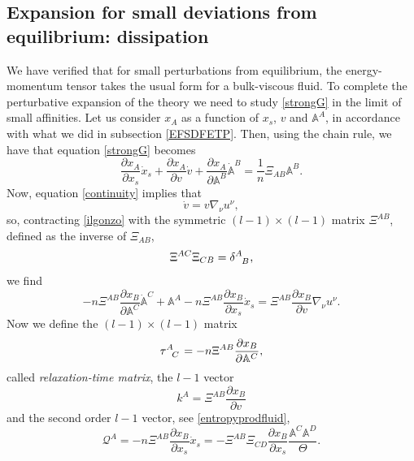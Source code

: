 \documentclass[useAMS,usenatbib,prd,twocolumn,nofootinbib]{revtex4-1}
\begin{document}
\subsection{Expansion for small deviations from equilibrium: dissipation}\label{expBuba!}

We have verified that for small perturbations from equilibrium, the energy-momentum tensor takes the usual form for a bulk-viscous fluid. To complete the perturbative expansion of the theory we need to study \eqref{strongG} in the limit of small affinities. 
Let us consider $x_A$ as a function of $x_s$, $v$ and $\mathbb{A}^A$, in accordance with what we did in subsection \ref{EFSDFETP}. Then, using the chain rule, we have that equation \eqref{strongG} becomes
\begin{equation}\label{ilgonzo}
\dfrac{\partial x_A}{\partial x_s} \dot{x}_s + \dfrac{\partial x_A}{\partial v} \dot{v} +  \dfrac{\partial x_A}{\partial \mathbb{A}^B} \dot{\mathbb{A}}^B = \dfrac{1}{n}  \Xi_{AB} \mathbb{A}^B.
\end{equation}
Now, equation \eqref{continuity} implies that
\begin{equation}
\dot{v} = v \nabla_\nu u^\nu ,
\end{equation}
so, contracting \eqref{ilgonzo} with the symmetric $(l-1)\times(l-1)$ matrix $\Xi^{AB}$, defined as the inverse of $\Xi_{AB}$,
\begin{equation}\label{inversemetric}
 \Xi^{AC} \Xi_{CB} = \delta\indices{^A _B}  ,
\end{equation}
we find
\begin{equation}\label{buzzzzurro}
-n \Xi^{AB} \dfrac{\partial x_B}{\partial \mathbb{A}^C} \dot{\mathbb{A}}^C + \mathbb{A}^A - n \Xi^{AB} \dfrac{\partial x_B}{\partial x_s} \dot{x}_s = \Xi^{AB} \dfrac{\partial x_B}{\partial v} \nabla_\nu u^\nu .
\end{equation}
Now we define the $(l-1)\times (l-1)$ matrix
\begin{equation}\label{TTau}
\tau\indices{^A _C} = -n \Xi^{AB} \dfrac{\partial x_B}{\partial \mathbb{A}^C},
\end{equation}
called \textit{relaxation-time matrix}, the $l-1$ vector
\begin{equation}\label{kappa}
k^A = \Xi^{AB} \dfrac{\partial x_B}{\partial v} 
\end{equation}
and the second order $l-1$ vector, see \eqref{entropyprodfluid},
\begin{equation}
\mathcal{Q}^A = - n \Xi^{AB} \dfrac{\partial x_B}{\partial x_s} \dot{x}_s = -\Xi^{AB} \Xi_{CD} \dfrac{\partial x_B}{\partial x_s}  \dfrac{\mathbb{A}^C \mathbb{A}^D}{\Theta}  .
\end{equation} 
\end{document}
